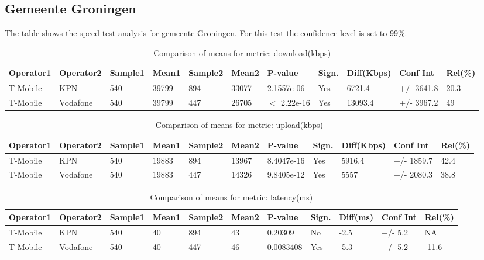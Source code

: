 \documentclass[]{article}
\begin{document}
\normalsize

\newpage

\subsection{Gemeente Groningen}\label{gemeente-groningen}

The table shows the speed test analysis for gemeente Groningen. For this
test the confidence level is set to 99\%.

\begin{table}[ht]
\centering
{\footnotesize
\begin{tabular}{lllllllllll}
  \hline
Operator1 & Operator2 & Sample1 & Mean1 & Sample2 & Mean2 & P-value & Sign. & Diff(Kbps) & Conf Int & Rel(\%) \\ 
  \hline
T-Mobile & KPN & 540 & 39799 & 894 & 33077 & 2.1557e-06 & Yes & 6721.4 & +/- 3641.8 & 20.3 \\ 
  T-Mobile & Vodafone & 540 & 39799 & 447 & 26705 & $<$ 2.22e-16 & Yes & 13093.4 & +/- 3967.2 & 49 \\ 
   \hline
\end{tabular}
}
\caption{Comparison of means for metric: download(kbps)} 
\end{table}\begin{table}[ht]
\centering
{\footnotesize
\begin{tabular}{lllllllllll}
  \hline
Operator1 & Operator2 & Sample1 & Mean1 & Sample2 & Mean2 & P-value & Sign. & Diff(Kbps) & Conf Int & Rel(\%) \\ 
  \hline
T-Mobile & KPN & 540 & 19883 & 894 & 13967 & 8.4047e-16 & Yes & 5916.4 & +/- 1859.7 & 42.4 \\ 
  T-Mobile & Vodafone & 540 & 19883 & 447 & 14326 & 9.8405e-12 & Yes & 5557 & +/- 2080.3 & 38.8 \\ 
   \hline
\end{tabular}
}
\caption{Comparison of means for metric: upload(kbps)} 
\end{table}\begin{table}[ht]
\centering
{\footnotesize
\begin{tabular}{lllllllllll}
  \hline
Operator1 & Operator2 & Sample1 & Mean1 & Sample2 & Mean2 & P-value & Sign. & Diff(ms) & Conf Int & Rel(\%) \\ 
  \hline
T-Mobile & KPN & 540 & 40 & 894 & 43 & 0.20309 & No & -2.5 & +/- 5.2 & NA \\ 
  T-Mobile & Vodafone & 540 & 40 & 447 & 46 & 0.0083408 & Yes & -5.3 & +/- 5.2 & -11.6 \\ 
   \hline
\end{tabular}
}
\caption{Comparison of means for metric: latency(ms)} 
\end{table}
\end{document}
